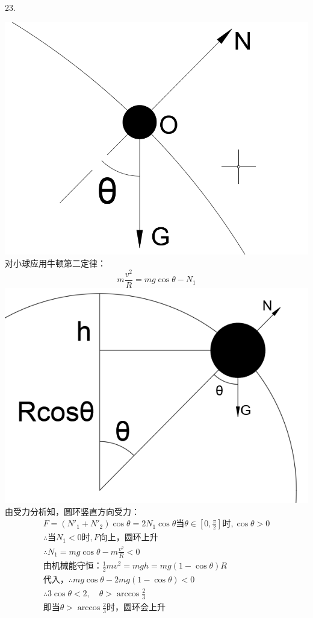 \documentclass[a4paper,fleqn,twocolumn]{article}
\begin{document}
   		23.\par
   		\includegraphics[scale=0.2]{Chp2_illus2.png}\\
   		对小球应用牛顿第二定律：
   		\[m\frac{v^2}{R}=mg\cos\theta-N_1\]
   		\includegraphics[scale=0.3]{Chp2_illus3.png}\\
   		由受力分析知，圆环竖直方向受力：
   		\begin{gather*}
   			F=(N'_1+N'_2)\cos\theta=2N_1\cos\theta
   			\text{当}\theta\in[0,\frac{\pi}{2}]\text{时},\cos\theta>0\\
   			\therefore\text{当}N_1<0\text{时},F\text{向上，圆环上升}\\
   			\therefore N_1=mg\cos\theta-m\frac{v^2}{R}<0\\
   			\text{由机械能守恒：}\frac{1}{2}mv^2=mgh=mg(1-\cos\theta)R\\
   			\text{代入，}\therefore mg\cos\theta-2mg(1-\cos\theta)<0\\
   			\therefore 3\cos\theta<2,\quad \theta>\arccos\frac{2}{3}\\
   			\text{即当}\theta>\arccos\frac{2}{3}\text{时，圆环会上升}
   		\end{gather*}
\end{document}

